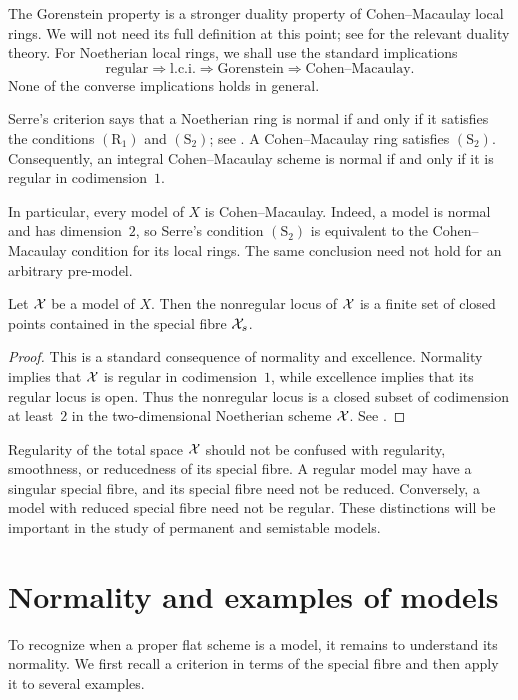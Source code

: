 The Gorenstein property is a stronger duality property of Cohen--Macaulay local
rings.
We will not need its full definition at this point; see
\cite[\S 6.4]{Liu} for the relevant duality theory.
For Noetherian local rings, we shall use the standard implications
\[
\text{regular}
\Longrightarrow
\text{l.c.i.}
\Longrightarrow
\text{Gorenstein}
\Longrightarrow
\text{Cohen--Macaulay}.
\]
None of the converse implications holds in general.

Serre's criterion says that a Noetherian ring is normal if and only if it satisfies
the conditions $(\mathrm{R}_1)$ and $(\mathrm{S}_2)$; see
\cite[Theorem 8.2.23]{Liu}.
A Cohen--Macaulay ring satisfies $(\mathrm{S}_2)$.
Consequently, an integral Cohen--Macaulay scheme is normal if and only if it is
regular in codimension~$1$.

In particular, every model of $X$ is Cohen--Macaulay.
Indeed, a model is normal and has dimension~$2$, so Serre's condition $(\mathrm{S}_2)$ is
equivalent to the Cohen--Macaulay condition for its local rings.
The same conclusion need not hold for an arbitrary pre-model.

\begin{proposition}\label{prop:nonregular-locus-of-model}
    Let $\mathcal X$ be a model of $X$.
    Then the nonregular locus of $\mathcal X$ is a finite set of closed points contained
    in the special fibre $\mathcal X_s$.
\end{proposition}

\begin{proof}
    This is a standard consequence of normality and excellence.
    Normality implies that $\mathcal X$ is regular in codimension~$1$, while excellence
    implies that its regular locus is open.
    Thus the nonregular locus is a closed subset of codimension at least~$2$ in the
    two-dimensional Noetherian scheme $\mathcal X$.
    See \cite[\S 8.2.3 and \S 8.3.1]{Liu}.
\end{proof}

\begin{remark}
    Regularity of the total space $\mathcal X$ should not be confused with regularity,
    smoothness, or reducedness of its special fibre.
    A regular model may have a singular special fibre, and its special fibre need not
    be reduced.
    Conversely, a model with reduced special fibre need not be regular.
    These distinctions will be important in the study of permanent and semistable
    models.
\end{remark}

\section{Normality and examples of models}\label{sec:normality-and-examples-of-models}
To recognize when a proper flat scheme is a model, it remains to understand its normality. We first recall a criterion in terms of the special fibre and then apply it to several examples.


